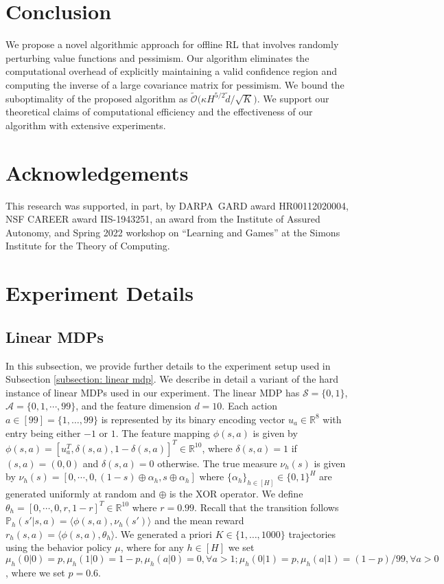 \documentclass{article} \usepackage{iclr2023/iclr2023_conference,times}
\begin{document}
%
 \section{Conclusion}
We propose a novel algorithmic approach for offline RL that involves randomly perturbing value functions and pessimism. Our algorithm eliminates the computational overhead of explicitly maintaining a valid confidence region and computing the inverse of a large covariance matrix for pessimism. We bound the suboptimality of the proposed algorithm as $\tilde{\mathcal{O}}\big(  { \kappa H^{5/2}  \tilde{d} }/{\sqrt{K}} \big)$. We support our theoretical claims of computational efficiency and the effectiveness of our algorithm with extensive experiments. 






\section*{Acknowledgements}
This research was supported, in part, by  DARPA~GARD award HR00112020004, NSF CAREER award IIS-1943251, an award from the Institute of Assured Autonomy, and Spring 2022 workshop on ``Learning and Games'' at the Simons Institute for the Theory of Computing. 

\newpage
\appendix
\section{Experiment Details}
\subsection{Linear MDPs}
\label{subsection: description of linear mdp}
In this subsection, we provide further details to the experiment setup used in Subsection \ref{subsection: linear mdp}. We describe in detail a variant of the hard instance of linear MDPs \citep{yinnear} used in our experiment. The linear MDP has $\mathcal{S} = \{0,1\}$, $\mathcal{A} = \{0,1, \cdots, 99\}$, and the feature dimension $d = 10$. Each action $a \in [99] = \{1, \ldots, 99\}$ is represented by its binary encoding vector $u_a \in \mathbb{R}^8$ with entry being either $-1$ or $1$. The feature mapping $\phi(s,a)$ is given by $\phi(s,a) = [u_a^T, \delta(s,a), 1 - \delta(s,a)]^T \in \mathbb{R}^{10}$, where $\delta(s,a) =1 $ if $(s,a)=(0,0)$ and $\delta(s,a) =0$ otherwise. The true measure $\nu_h(s)$ is given by $\nu_h(s) = [0,\cdots, 0, (1 - s) \oplus \alpha_h, s \oplus \alpha_h]$  where $\{\alpha_h\}_{h \in [H]} \in \{0,1\}^{H}$ are generated uniformly at random and $\oplus$ is the XOR operator. We define $\theta_h = [0, \cdots, 0, r, 1 - r]^T \in \mathbb{R}^{10}$ where $r = 0.99$. Recall that the transition follows $\mathbb{P}_h(s'|s,a) = \langle \phi(s,a), \nu_h(s') \rangle$ and the mean reward $r_h(s,a) = \langle \phi(s,a), \theta_h \rangle$. We generated a priori $K \in \{1, \ldots, 1000\}$ trajectories using the behavior policy $\mu$, where for any $h \in [H]$ we set $\mu_h(0|0) = p, \mu_h(1|0) = 1 - p, \mu_h(a|0) = 0 ,\forall a >1; \mu_h(0|1) =  p, \mu_h(a|1) = (1 - p)/99, \forall a > 0 $, where we set $p = 0.6$.
\end{document}
